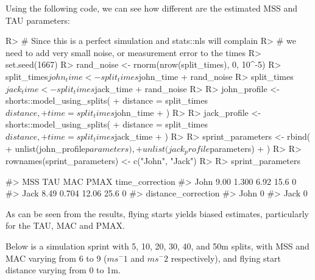 \documentclass[
]{jss}
\begin{document}
Using the following code, we can see how different are the estimated MSS and TAU parameters:

\begin{CodeChunk}
\begin{CodeInput}
R> # Since this is a perfect simulation and stats::nls will complain
R> # we need to add very small noise, or measurement error to the times
R> set.seed(1667)
R> rand_noise <- rnorm(nrow(split_times), 0, 10^-5)
R> split_times$john_time <- split_times$john_time + rand_noise
R> split_times$jack_time <- split_times$jack_time + rand_noise
R> 
R> john_profile <- shorts::model_using_splits(
+   distance = split_times$distance,
+   time = split_times$john_time
+ )
R> 
R> jack_profile <- shorts::model_using_splits(
+   distance = split_times$distance,
+   time = split_times$jack_time
+ )
R> 
R> sprint_parameters <- rbind(
+   unlist(john_profile$parameters),
+   unlist(jack_profile$parameters)
+ )
R> 
R> rownames(sprint_parameters) <- c("John", "Jack")
R> 
R> sprint_parameters
\end{CodeInput}
\begin{CodeOutput}
#>       MSS   TAU   MAC PMAX time_correction
#> John 9.00 1.300  6.92 15.6               0
#> Jack 8.49 0.704 12.06 25.6               0
#>      distance_correction
#> John                   0
#> Jack                   0
\end{CodeOutput}
\end{CodeChunk}

As can be seen from the results, flying starts yields biased estimates, particularly for the TAU, MAC and PMAX.

Below is a simulation sprint with 5, 10, 20, 30, 40, and 50m splits, with MSS and MAC varying from 6 to 9 (\(ms^-1\) and \(ms^-2\) respectively), and flying start distance varying from 0 to 1m.
\end{document}
